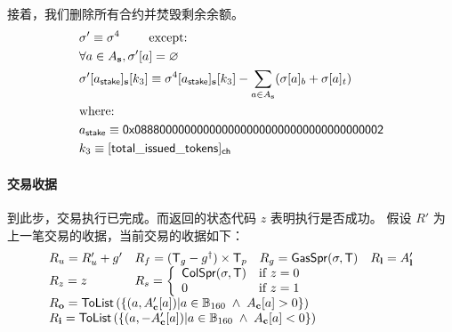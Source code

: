 接着，我们删除所有合约并焚毁剩余余额。
%
\begin{align}
&\st' \eqdef \st^4 \qquad \mbox{  except:} \\ 
&\forall a \in A_{\bf s}, \st'[a] = \varnothing \\ 
&\st'[a_{\sf stake}]_{\bf s}[k_3] \eqdef \st^4[a_{\sf stake}]_{\bf s}[k_3] - \sum_{a\in A_{\bf s}} (\st[a]_b + \st[a]_t) \\
&\mbox{where:}  \\
&a_{\sf stake} \eqdef \stakingcontract \\ 
&k_3 \eqdef {\sf [total\char`_issued\char`_tokens]_{\sf ch}}  
\end{align}

\paragraph{交易收据} 

到此步，交易执行已完成。而返回的状态代码 $z$ 表明执行是否成功。
假设 $R'$ 为上一笔交易的收据，当前交易的收据如下：
\begin{align}
	\begin{array}{llll}
		R_u=R'_u+g' & R_f = (\tx_g-g^{\dagger})\times \tx_p & R_g = \mathsf{GasSpr}(\st,\tx) & R_{\bf l}=A'_{\bf l} \\  
		R_z=z & \multicolumn{3}{l}{R_s = \left\{\begin{array}{ll}
			\mathsf{ColSpr}(\st,\tx) & \text{if }z=0\\
			0 & \text{if }z=1
		\end{array}\right.} \\
		\multicolumn{4}{l}{R_{\bf o}=\mathsf{ToList}\left(\left\{ (a,A'_{\bf c}[a]) | a\in \B_{160}\;\wedge\; A_{\bf c}[a]>0 \right\}\right)}\\
		\multicolumn{4}{l}{R_{\bf i}=\mathsf{ToList}\left(\left\{(a,-A'_{\bf c}[a]) | a\in \B_{160}\;\wedge\; A_{\bf c}[a]<0  \right\}\right)}
	\end{array}
\end{align}

